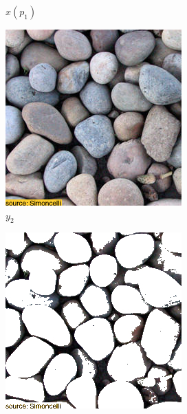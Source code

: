\begin{figure}[ht]
\begin{subfigure}{\textwidth}
\begin{subfigure}{0.2\textwidth}
            \caption*{\(x(p_1)\)}
            \label{fig:intro_pixels_vs_stats-pixels_proj}
        \end{subfigure}
        
        \begin{subfigure}{0.2\textwidth}
            \centering
            \includegraphics[width=\textwidth]{images/01-pixels_vs_stats-stats_target.jpg}
            \caption*{\(y_2\)}
            \label{fig:intro_pixels_vs_stats-stats_target}
        \end{subfigure}
        \hfill
        \begin{subfigure}{0.2\textwidth}
            \centering
            \includegraphics[width=\textwidth]{images/01-pixels_vs_stats-bg.jpg}

\end{subfigure}
\end{subfigure}
\end{figure}
